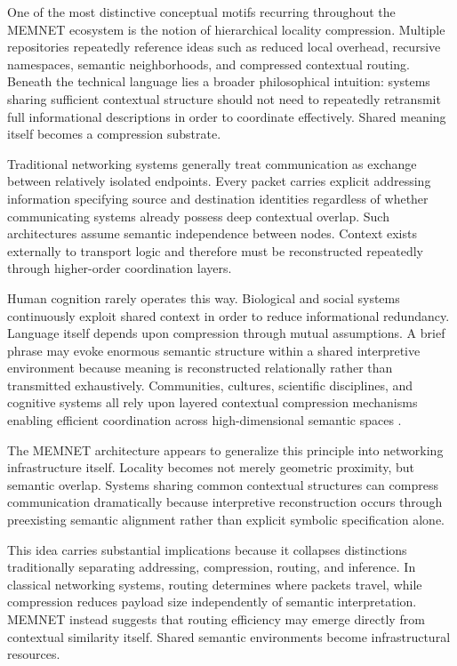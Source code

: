 \documentclass[11pt,a4paper]{article}
\begin{document}
One of the most distinctive conceptual motifs recurring throughout the MEMNET ecosystem is the notion of hierarchical locality compression. Multiple repositories repeatedly reference ideas such as reduced local overhead, recursive namespaces, semantic neighborhoods, and compressed contextual routing. Beneath the technical language lies a broader philosophical intuition: systems sharing sufficient contextual structure should not need to repeatedly retransmit full informational descriptions in order to coordinate effectively. Shared meaning itself becomes a compression substrate.

Traditional networking systems generally treat communication as exchange between relatively isolated endpoints. Every packet carries explicit addressing information specifying source and destination identities regardless of whether communicating systems already possess deep contextual overlap. Such architectures assume semantic independence between nodes. Context exists externally to transport logic and therefore must be reconstructed repeatedly through higher-order coordination layers.

Human cognition rarely operates this way. Biological and social systems continuously exploit shared context in order to reduce informational redundancy. Language itself depends upon compression through mutual assumptions. A brief phrase may evoke enormous semantic structure within a shared interpretive environment because meaning is reconstructed relationally rather than transmitted exhaustively. Communities, cultures, scientific disciplines, and cognitive systems all rely upon layered contextual compression mechanisms enabling efficient coordination across high-dimensional semantic spaces \cite{hutchins1995}.

The MEMNET architecture appears to generalize this principle into networking infrastructure itself. Locality becomes not merely geometric proximity, but semantic overlap. Systems sharing common contextual structures can compress communication dramatically because interpretive reconstruction occurs through preexisting semantic alignment rather than explicit symbolic specification alone.

This idea carries substantial implications because it collapses distinctions traditionally separating addressing, compression, routing, and inference. In classical networking systems, routing determines where packets travel, while compression reduces payload size independently of semantic interpretation. MEMNET instead suggests that routing efficiency may emerge directly from contextual similarity itself. Shared semantic environments become infrastructural resources.
\end{document}
